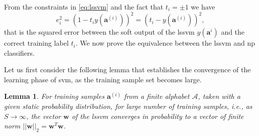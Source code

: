 \documentclass[draftcls,onecolumn,12pt]{IEEEtran}
\newtheorem{lemma}{Lemma}
\begin{document}
From the constraints in \eqref{eq:lssvm} and the fact that $t_i = \pm 1$ we have
\begin{equation}
\label{eq:els}
e_i^2 = (1 - t_iy(\mathbf{a}^{(i)}) )^2 = (t_i - y(\mathbf{a}^{(i)}))^2,
\end{equation}
that is the squared error between the soft output of the \ac{lssvm} $y(\mathbf{a}^i)$ and the correct training label $t_i$. We now prove the equivalence between the \ac{lssvm} and \ac{np} classifiers. 

Let us first consider the following lemma that establishes the convergence of the learning phase of \ac{svm}, as the training sample set becomes large.

\begin{lemma}
	\label{lem:lem1}
	For training samples $\bm{a}^{(i)}$ from a finite alphabet $\mathcal A$, taken with a given static probability distribution, for large number of training samples, i.e., as $S \rightarrow \infty$, the vector $\bm{w}$ of the \ac{lssvm} converges in probability to a vector of finite norm $||\mathbf{w}||_2 = \mathbf{w}^T\mathbf{w}$.
\end{lemma}
\end{document}
